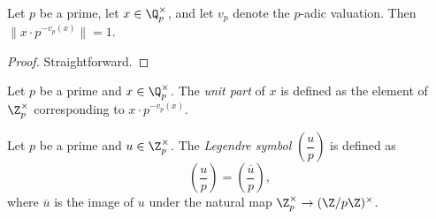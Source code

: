 \begin{lemma}\label{lem:padic_unit_part_unit}
\leanok
Let $p$ be a prime, let $x \in \Q_p^\times$, and let $v_p$ denote the $p$-adic valuation. Then $\|x \cdot p^{-v_p(x)}\| = 1$.
\end{lemma}
\begin{proof}
\leanok
Straightforward.
\end{proof}

\begin{definition}\label{def:padicUnitPart}
  \leanok
Let $p$ be a prime and $x \in \Q_p^\times$. The \emph{unit part} of $x$ is defined as the element
of $\Z_p^\times$ corresponding to $x \cdot p^{-v_p(x)}$.
\end{definition}

\begin{definition}\label{def:legendreSym}
  \leanok
Let $p$ be a prime and $u \in \Z_p^\times$. The \emph{Legendre symbol} $\left(\dfrac{u}{p}\right)$
is defined as
\[\left(\dfrac{u}{p}\right)=\left(\dfrac{\overline{u}}{p}\right),\]
where $\overline{u}$ is the image of $u$ under the natural map $\Z_p^\times \to (\Z/p\Z)^\times$.
\end{definition}
